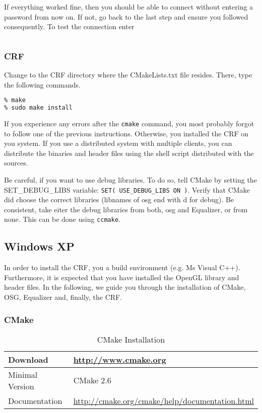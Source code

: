If everything worked fine, then you should be able to connect without entering a password from now on. If not, go back to the last step and ensure you followed consequently. To test the connection enter
\begin{lstlisting}[language=bash]
% ssh <ip-of-host> 
\end{lstlisting}


\subsubsection{CRF}

Change to the CRF directory where the CMakeLists.txt file resides. There, type the following commands.

\begin{lstlisting}[language=bash,caption={CRF installation}]
% cmake .
% make
% sudo make install
\end{lstlisting}

If you experience any errors after the \texttt{cmake} command, you most probably forgot to follow one of the previous instructions. Otherwise, you installed the CRF on you system. If you use a distributed system with multiple clients, you can distribute the binaries and header files using the shell script distributed with the sources.

Be careful, if you want to use debug libraries. To do so, tell CMake by setting the SET\_DEBUG\_LIBS variable: \texttt{SET( USE\_DEBUG\_LIBS ON )}. Verify that CMake did choose the correct libraries (libnames of \gls{osg} end with d for debug). Be consistent, take eiter the debug libraries from both, \gls{osg} and Equalizer, or from none. This can be done using \texttt{ccmake}.


\subsection{Windows XP}
\label{sec:win_setup}

In order to install the CRF, you a build environment (e.g. Ms Visual C++). Furthermore, it is expected that you have installed the OpenGL library and header files. In the following, we guide you through the installation of CMake, OSG, Equalizer and, finally, the CRF.

\subsubsection{CMake}

\begin{table}[H]
	\centering
	\begin{tabular}{|p{}|p{}|}
		\hline Download & \href{http://www.cmake.org}{http://www.cmake.org} \\
		\hline Minimal Version & CMake 2.6 \\
		\hline Documentation & \href{http://cmake.org/cmake/help/documentation.html}{http://cmake.org/cmake/help/documentation.html} \\
		\hline
	\end{tabular}
	\caption{CMake Installation}
\end{table}

